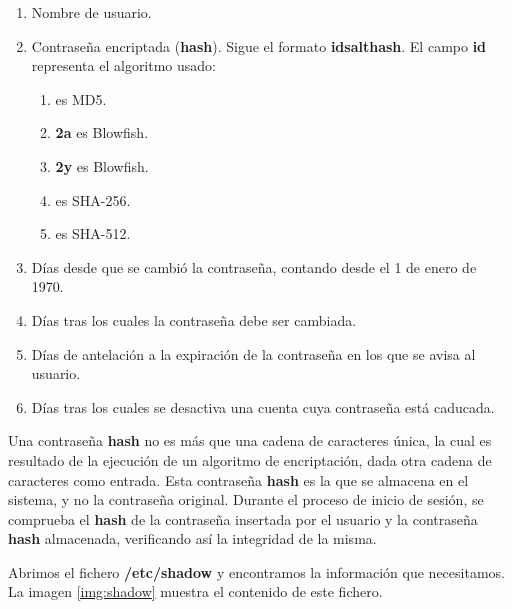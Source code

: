 \begin{enumerate}
    \item Nombre de usuario.
    \item Contraseña encriptada (\textbf{hash}). Sigue el formato \textbf{\textdollar id\textdollar salt\textdollar hash}. El campo \textbf{\textdollar id} representa el algoritmo usado:
        \begin{enumerate}
           \item \textbf{\textdollar } es MD5.
           \item \textbf{\textdollar 2a\textdollar} es Blowfish.
           \item \textbf{\textdollar 2y\textdollar} es Blowfish.
           \item \textbf{\textdollar } es SHA-256.
           \item \textbf{\textdollar } es SHA-512.
        \end{enumerate}
    \item Días desde que se cambió la contraseña, contando desde el 1 de enero de 1970.
    \item Días tras los cuales la contraseña debe ser cambiada.
    \item Días de antelación a la expiración de la contraseña en los que se avisa al usuario.
    \item Días tras los cuales se desactiva una cuenta cuya contraseña está caducada.
\end{enumerate}

\begin{shaded}
    \noindent
    Una contraseña \textbf{hash} no es más que una cadena de caracteres única, la cual es resultado de la ejecución de un algoritmo de encriptación, dada otra cadena de caracteres como entrada. Esta contraseña \textbf{hash} es la que se almacena en el sistema, y no la contraseña original. Durante el proceso de inicio de sesión, se comprueba el \textbf{hash} de la contraseña insertada por el usuario y la contraseña \textbf{hash} almacenada, verificando así la integridad de la misma.
\end{shaded}

Abrimos el fichero \textbf{/etc/shadow} y encontramos la información que necesitamos. La imagen \ref{img:shadow} muestra el contenido de este fichero.

